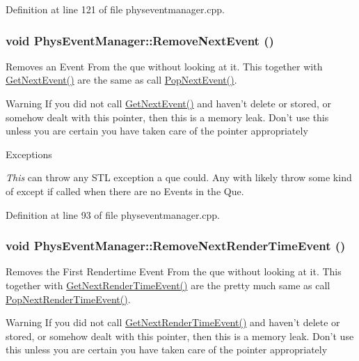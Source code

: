 Definition at line 121 of file physeventmanager.cpp.\hypertarget{classPhysEventManager_ad040054bd9018ff0fd27ad78ec1e87fa}{
\subsubsection[{RemoveNextEvent}]{\setlength{\rightskip}{0pt plus 5cm}void PhysEventManager::RemoveNextEvent ()}}
\label{d5/dd7/classPhysEventManager_ad040054bd9018ff0fd27ad78ec1e87fa}


Removes an Event From the que without looking at it. This together with \hyperlink{classPhysEventManager_a6de94bc6c23dcbd7e15785cadee2e80b}{GetNextEvent()} are the same as call \hyperlink{classPhysEventManager_a3122b32172326ac32cfecc828b820977}{PopNextEvent()}. \begin{DoxyWarning}{Warning}
If you did not call \hyperlink{classPhysEventManager_a6de94bc6c23dcbd7e15785cadee2e80b}{GetNextEvent()} and haven't delete or stored, or somehow dealt with this pointer, then this is a memory leak. Don't use this unless you are certain you have taken care of the pointer appropriately 
\end{DoxyWarning}

\begin{DoxyExceptions}{Exceptions}
\item[{\em This}]can throw any STL exception a que could. Any with likely throw some kind of except if called when there are no Events in the Que. \end{DoxyExceptions}


Definition at line 93 of file physeventmanager.cpp.\hypertarget{classPhysEventManager_a56acc075e743921e27284c023b3298ce}{
\subsubsection[{RemoveNextRenderTimeEvent}]{\setlength{\rightskip}{0pt plus 5cm}void PhysEventManager::RemoveNextRenderTimeEvent ()}}
\label{d5/dd7/classPhysEventManager_a56acc075e743921e27284c023b3298ce}


Removes the First Rendertime Event From the que without looking at it. This together with \hyperlink{classPhysEventManager_a1f2d0506ce816176913e5bdfaa9fd724}{GetNextRenderTimeEvent()} are the pretty much same as call \hyperlink{classPhysEventManager_ad627925363fdbcff98e0faef204e81e2}{PopNextRenderTimeEvent()}. \begin{DoxyWarning}{Warning}
If you did not call \hyperlink{classPhysEventManager_a1f2d0506ce816176913e5bdfaa9fd724}{GetNextRenderTimeEvent()} and haven't delete or stored, or somehow dealt with this pointer, then this is a memory leak. Don't use this unless you are certain you have taken care of the pointer appropriately 
\end{DoxyWarning}

